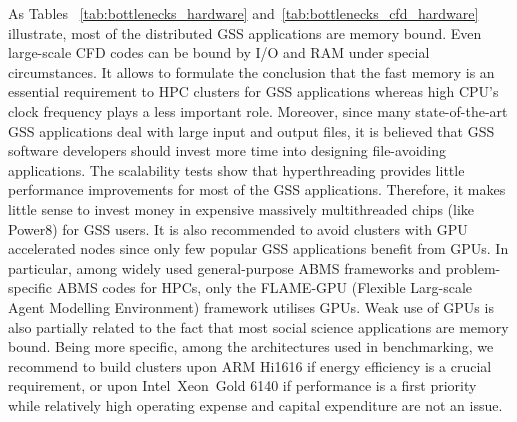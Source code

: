 As Tables ~\ref{tab:bottlenecks_hardware} and~\ref{tab:bottlenecks_cfd_hardware} illustrate, most of the distributed GSS applications are memory bound. Even large-scale CFD codes can be bound by I/O and RAM under special circumstances. It allows to formulate the conclusion that the fast memory is an essential requirement to HPC clusters for GSS applications whereas high CPU’s clock frequency plays a less important role. Moreover, since many state-of-the-art GSS applications deal with large input and output files, it is believed that GSS software developers should invest more time into designing file-avoiding applications. The scalability tests show that hyperthreading provides little performance improvements for most of the GSS applications. Therefore, it makes little sense to invest money in expensive massively multithreaded chips (like Power8) for GSS users. It is also recommended to avoid clusters with GPU accelerated nodes since only few popular GSS applications benefit from GPUs. In particular, among widely used general-purpose ABMS frameworks and problem-specific ABMS codes for HPCs, only the FLAME-GPU (Flexible Larg-scale Agent Modelling Environment) \cite{2011:flame_gpu} \cite{2018:flame_gpu} framework utilises GPUs. Weak use of GPUs is also partially related to the fact that most social science applications are memory bound. Being more specific, among the architectures used in benchmarking, we recommend to build clusters upon ARM Hi1616 if energy efficiency is a crucial requirement, or upon Intel\textregistered\ Xeon\textregistered\ Gold 6140 if performance is a first priority while relatively high operating expense and capital expenditure are not an issue.


